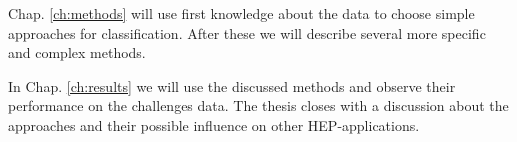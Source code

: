 Chap. \ref{ch:methods}  will use first knowledge about the data to choose simple approaches for classification. After these we will describe several more specific and complex methods.

In Chap. \ref{ch:results} we will use the discussed methods and observe their performance on the challenges data. The thesis closes with a discussion about the approaches and their possible influence on other HEP-applications.
\pagebreak
\clearpage

	{\pagebreak \thispagestyle{empty} \cleardoublepage}{\clearpage}